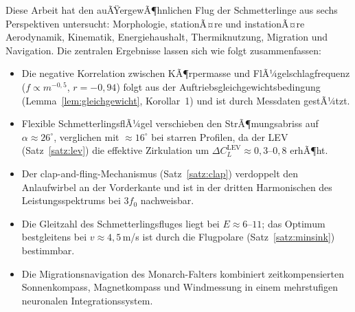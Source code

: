 ﻿\documentclass[a4paper,12pt]{article}
\theoremstyle{definition}
\begin{document}
	Diese Arbeit hat den auÃŸergewÃ¶hnlichen Flug der Schmetterlinge aus sechs
	Perspektiven untersucht: Morphologie, stationÃ¤re und instationÃ¤re Aerodynamik,
	Kinematik, Energiehaushalt, Thermiknutzung, Migration und Navigation.
	Die zentralen Ergebnisse lassen sich wie folgt zusammenfassen:
	
	\begin{itemize}
		\item Die negative Korrelation zwischen KÃ¶rpermasse und FlÃ¼gelschlagfrequenz
		($f \propto m^{-0{,}5}$, $r = -0{,}94$) folgt aus der
		Auftriebsgleichgewichtsbedingung (Lemma~\ref{lem:gleichgewicht},
		Korollar~1) und ist durch Messdaten gestÃ¼tzt.
		
		\item Flexible SchmetterlingsflÃ¼gel verschieben den StrÃ¶mungsabriss auf
		$\alpha \approx 26^\circ$, verglichen mit $\approx 16^\circ$ bei starren
		Profilen, da der LEV (Satz~\ref{satz:lev}) die effektive Zirkulation
		um $\Delta C_L^{\mathrm{LEV}} \approx 0{,}3$--$0{,}8$ erhÃ¶ht.
		
		\item Der clap-and-fling-Mechanismus (Satz~\ref{satz:clap}) verdoppelt
		den Anlaufwirbel an der Vorderkante und ist in der dritten Harmonischen
		des Leistungsspektrums bei $3f_0$ nachweisbar.
		
		\item Die Gleitzahl des Schmetterlingsfluges liegt bei $E \approx 6$--$11$;
		das Optimum bestgleitens bei $v \approx 4{,}5$\,m/s ist durch die
		Flugpolare (Satz~\ref{satz:minsink}) bestimmbar.
		
		\item Die Migrationsnavigation des Monarch-Falters kombiniert zeitkompensierten
		Sonnenkompass, Magnetkompass und Windmessung in einem mehrstufigen
		neuronalen Integrationssystem.
	\end{itemize}
	
\end{document}
